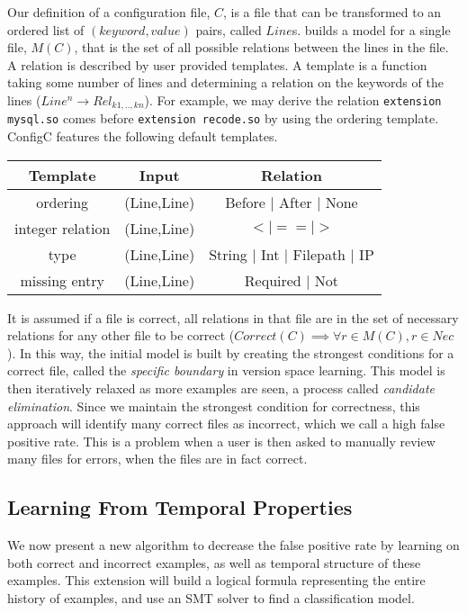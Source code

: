 Our definition of a configuration file, $C$, is a file that can be
transformed to an ordered list of $(keyword, value)$ pairs, called
$Line$s. \app builds a model for a single file, $M(C)$, 
that is the set of all possible relations between the lines in the file.
A relation is described by user provided templates.
A template is a function taking some number of lines and determining 
a relation on the keywords of 
the lines ($Line^{n} \rightarrow Rel_{k1,..,kn}$).
For example, we may derive the relation \texttt{extension mysql.so} comes before \texttt{extension recode.so} by using the ordering template.
ConfigC features the following default templates.

\begin{center}
\begin{tabular} {|c|c|c|}
 \hline
 Template & Input  & Relation \\
\hline
\hline
 ordering & (Line,Line) & Before $\vert$ After $\vert$ None \\
 \hline
 integer relation & (Line,Line)  & $< | == | >$  \\
\hline
 type & (Line,Line)  & String $\vert$ Int $\vert$ Filepath $\vert$ IP  \\
\hline
 missing entry & (Line,Line) & Required $\vert$ Not \\
\hline
\end{tabular}
\end{center}

It is assumed if a file is correct, all relations in that file are in the set of necessary relations for any other file to be correct ($Correct(C) \implies \forall r \in M(C), r \in Nec$).
In this way, the initial model is built by creating the strongest conditions for a correct file, called the \textit{specific boundary} in version space learning.
This model is then iteratively relaxed as more examples are seen, a process called \textit{candidate elimination}.
Since we maintain the strongest condition for correctness, this approach will identify many correct files as incorrect, which we call a high false positive rate.
This is a problem when a user is then asked to manually review many files for errors, when the files are in fact correct.

\subsection{Learning From Temporal Properties} 

We now present a new algorithm to decrease the false positive rate 
by learning on both correct and incorrect examples, 
as well as temporal structure of these examples.
This extension will build a logical formula representing the entire 
history of examples, and use an SMT solver to find a classification model.

